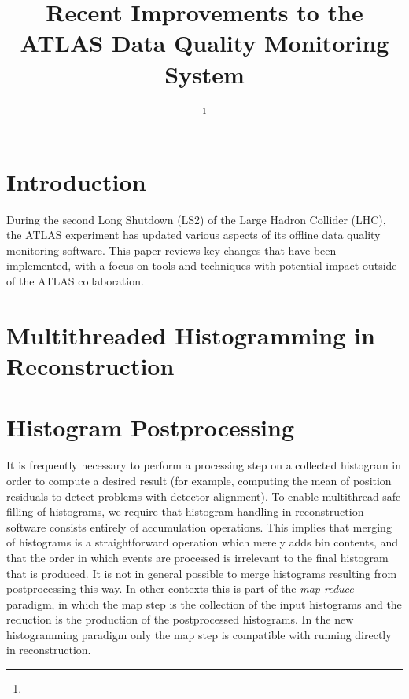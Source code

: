 \documentclass{webofc}
\begin{document}
%
\title{Recent Improvements to the ATLAS Data Quality Monitoring System}
%
%

\author{ \fnsep\thanks{} \and
          \and
         
}


%
\maketitle
%
\section{Introduction}
\label{intro}
During the second Long Shutdown (LS2) of the Large Hadron Collider (LHC), the ATLAS experiment has updated various aspects of its offline data quality monitoring software. This paper reviews key changes that have been implemented, with a focus on tools and techniques with potential impact outside of the ATLAS collaboration.
\section{Multithreaded Histogramming in Reconstruction}

\section{Histogram Postprocessing}
It is frequently necessary to perform a processing step on a collected histogram in order to compute a desired result (for example, computing the mean of position residuals to detect problems with detector alignment). To enable multithread-safe filling of histograms, we require that histogram handling in reconstruction software consists entirely of accumulation operations. This implies that merging of histograms is a straightforward operation which merely adds bin contents, and that the order in which events are processed is irrelevant to the final histogram that is produced. It is not in general possible to merge histograms resulting from postprocessing this way. In other contexts this is part of the \textit{map-reduce} paradigm, in which the map step is the collection of the input histograms and the reduction is the production of the postprocessed histograms.  In the new histogramming paradigm only the map step is compatible with running directly in reconstruction.
\end{document}
